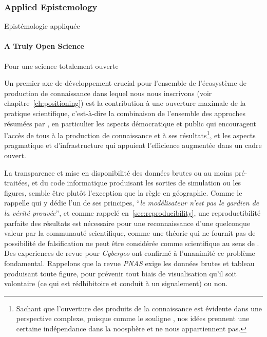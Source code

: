 \subsubsection*{Applied Epistemology}{Epistémologie appliquée}


\paragraph{A Truly Open Science}{Pour une science totalement ouverte}

Un premier axe de développement crucial pour l'ensemble de l'écosystème de production de connaissance dans lequel nous nous inscrivons (voir chapitre~\ref{ch:positioning}) est la contribution à une ouverture maximale de la pratique scientifique, c'est-à-dire la combinaison de l'ensemble des approches résumées par \cite{fecher2014open}, en particulier les aspects démocratique et public qui encouragent l'accès de tous à la production de connaissance et à ses résultats\footnote{Sachant que l'ouverture des produits de la connaissance est évidente dans une perspective complexe, puisque comme le souligne \cite{morin1991methode}, nos idées prennent une certaine indépendance dans la noosphère et ne nous appartiennent pas.}, et les aspects pragmatique et d'infrastructure qui appuient l'efficience augmentée dans un cadre ouvert.

La transparence et mise en disponibilité des données brutes ou au moins pré-traitées, et du code informatique produisant les sorties de simulation ou les figures, semble être plutôt l'exception que la règle en géographie. Comme le rappelle \cite{banos2013pour} qui y dédie l'un de ses principes, ``\textit{le modélisateur n'est pas le gardien de la vérité prouvée}'', et comme rappelé en~\ref{sec:reproducibility}, une reproductibilité parfaite des résultats est nécessaire pour une reconnaissance d'une quelconque valeur par la communauté scientifique, comme une théorie qui ne fournit pas de possibilité de falsification ne peut être considérée comme scientifique au sens de . Des experiences de revue pour \emph{Cybergeo} ont confirmé à l'unanimité ce problème fondamental. Rappelons que la revue \emph{PNAS} exige les données brutes et tableau produisant toute figure, pour prévenir tout biais de visualisation qu'il soit volontaire (ce qui est rédhibitoire et conduit à un signalement) ou non.

